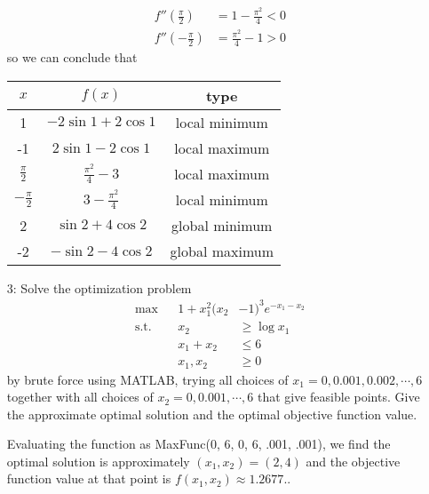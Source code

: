 \documentclass{article}
\begin{document}
\begin{itemize}
\begin{soln}
\begin{align*}
				f''\left( \frac{\pi}{2} \right) &= 1-\frac{\pi^2}{4} < 0 \\
				f''\left( -\frac{\pi}{2} \right) &= \frac{\pi^2}{4}-1 > 0
			\end{align*} so we can conclude that
			\begin{center}
				\begin{tabular}{c|c|c}
					$x$ & $f(x)$ & type \\
					\hline
					1 & $-2\sin 1+2\cos 1$ & local minimum \\
					-1 & $2\sin 1 - 2\cos 1$ & local maximum \\
					$\frac{\pi}{2}$ & $\frac{\pi^2}{4} - 3$ & local maximum \\
					$-\frac{\pi}{2}$ & $3-\frac{\pi^2}{4}$ & local minimum \\
					2 & $\sin 2 + 4\cos 2$ & global minimum \\
					-2 & $-\sin2-4\cos2$ & global maximum
				\end{tabular}
			\end{center}
		\end{soln}



		\newpage

	\item[3:] Solve the optimization problem
		\begin{align*}
			\max & & 1+x_1^2(x_2&-1)^3 e^{-x_1-x_2} \\
			\text{s.t.} & & x_2&\ge\log x_1 \\
			& &x_1+x_2 &\le 6 \\
			& &x_1, x_2 &\ge 0
		\end{align*} by brute force using MATLAB, trying all choices of $x_1=0, 0.001, 0.002, \cdots, 6$ together with all choices of $x_2=0, 0.001, \cdots, 6$ that give feasible points. Give the approximate optimal solution and the optimal objective function value.
		\lstset{language=Matlab}
		
		\begin{soln}
			Evaluating the function as MaxFunc(0, 6, 0, 6, .001, .001), we find the optimal solution is approximately $(x_1, x_2) = \boxed{(2, 4)}$ and the objective function value at that point is $f(x_1, x_2)\approx \boxed{1.2677.}.$
		\end{soln}

		\newpage


\end{itemize}
\end{document}
